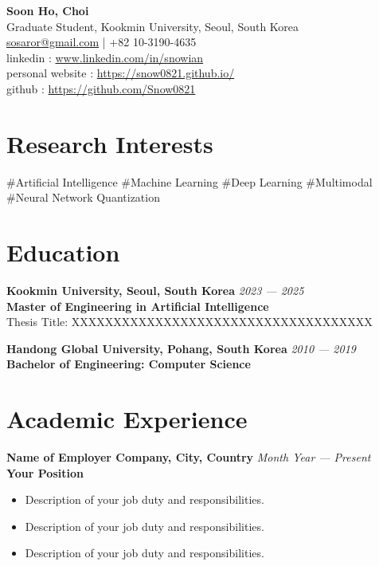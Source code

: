 \documentclass[11pt, a4paper]{article}
\newcommand{\itemheader}[2]{
    \noindent\textbf{#1} \hfill \textit{#2} \\
}
\begin{document}
{\huge \textbf{Soon Ho, Choi}}\\[0.1cm]
Graduate Student, Kookmin University, Seoul, South Korea \\
\href{mailto:sosaror@gmail.com}{sosaror@gmail.com} | +82 10-3190-4635 \\
linkedin : \href{https://www.linkedin.com/in/snowian}{www.linkedin.com/in/snowian} \\
personal website : \href{https://snow0821.github.io/}{https://snow0821.github.io/} \\
github : \href{https://github.com/Snow0821}{https://github.com/Snow0821}

\vspace{0.3cm}

\section*{Research Interests}
\noindent
\#Artificial Intelligence \#Machine Learning \#Deep Learning \#Multimodal \\
\#Neural Network Quantization

\section*{Education}
\itemheader{Kookmin University, Seoul, South Korea}{2023 — 2025}
\textbf{Master of Engineering in Artificial Intelligence} \\
Thesis Title: XXXXXXXXXXXXXXXXXXXXXXXXXXXXXXXXXXXX \\

\vspace{0.3cm}

\itemheader{Handong Global University, Pohang, South Korea}{2010 — 2019}
\textbf{Bachelor of Engineering: Computer Science} 

\section*{Academic Experience}
\itemheader{Name of Employer Company, City, Country}{Month Year — Present}
\textbf{Your Position} \\
\begin{itemize}[left=0pt]
    \item Description of your job duty and responsibilities.
    \item Description of your job duty and responsibilities.
    \item Description of your job duty and responsibilities.
\end{itemize}
\end{document}
